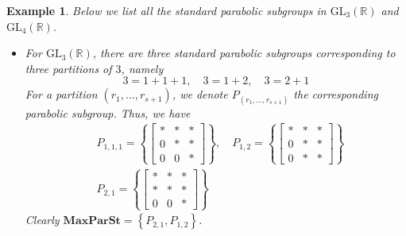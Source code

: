 \documentclass[12pt]{article} %
\newtheorem{example}[definition]{Example}
\begin{document}
\begin{example}
    Below we list all the standard parabolic subgroups in $\text{GL}_3(\mathbb{R})$ and $\text{GL}_4(\mathbb{R})$.
    \begin{itemize}
        \item For $\text{GL}_3(\mathbb{R})$, there are three standard parabolic subgroups corresponding to
              three partitions of $3$, namely
              \[ 3 = 1+ 1+ 1, \quad 3 =1+2 , \quad 3 = 2+1\]
              For a partition $(r_1,\ldots,r_{s+1})$, we denote $P_{(r_1,\ldots,r_{s+1})}$ the corresponding parabolic subgroup. Thus, we have
              \begin{align*}
                   & P_{1,1,1} = \left\lbrace \begin{bmatrix}
                                                  \ast & \ast & \ast \\
                                                  0    & \ast & \ast \\
                                                  0    & 0    & \ast
                                              \end{bmatrix}\right\rbrace, \quad P_{1,2} =\left\lbrace \begin{bmatrix}
                                                                                                          \ast & \ast & \ast \\
                                                                                                          0    & \ast & \ast \\
                                                                                                          0    & \ast & \ast
                                                                                                      \end{bmatrix}\right\rbrace \\
                   & P_{2,1} = \left\lbrace \begin{bmatrix}
                                                \ast & \ast & \ast \\
                                                \ast & \ast & \ast \\
                                                0    & 0    & \ast
                                            \end{bmatrix}\right\rbrace
              \end{align*}
              Clearly $\textbf{MaxParSt} = \left\lbrace P_{2,1}, P_{1,2}\right\rbrace$.

\end{itemize}
\end{example}
\end{document}
